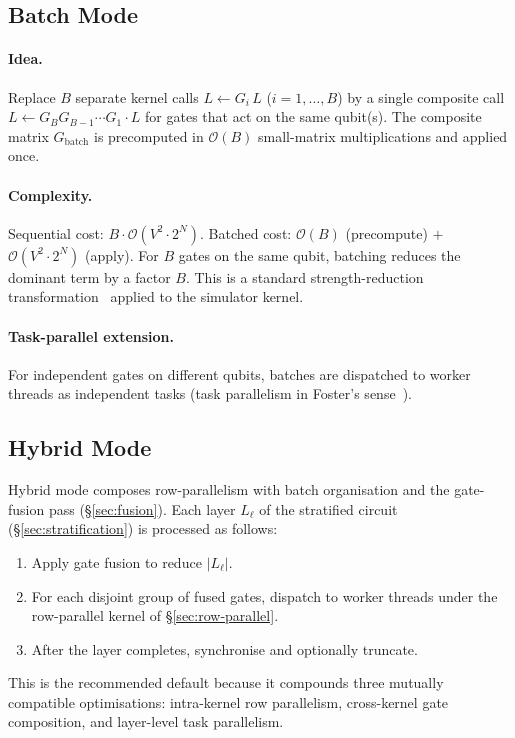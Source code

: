 \documentclass[11pt,a4paper]{article}
\begin{document}
\subsection{Batch Mode}
\label{sec:batch-mode}

\paragraph{Idea.}
Replace $B$ separate kernel calls $L \leftarrow G_i\,L$ ($i=1,\ldots,B$) by a single
composite call $L \leftarrow G_B G_{B-1} \cdots G_1 \cdot L$ for gates that act on the
same qubit(s). The composite matrix $G_\mathrm{batch}$ is precomputed in $\mathcal{O}(B)$
small-matrix multiplications and applied once.

\paragraph{Complexity.}
Sequential cost: $B \cdot \mathcal{O}(V^2 \cdot 2^N)$. Batched cost: $\mathcal{O}(B)$
(precompute) $+$ $\mathcal{O}(V^2\cdot 2^N)$ (apply). For $B$ gates on the same qubit,
batching reduces the dominant term by a factor $B$. This is a standard strength-reduction
transformation~\cite{cormen2009} applied to the simulator kernel.

\paragraph{Task-parallel extension.}
For independent gates on different qubits, batches are dispatched to worker threads as
independent tasks (task parallelism in Foster's sense~\cite{foster1995}).

\subsection{Hybrid Mode}
\label{sec:hybrid-mode}

Hybrid mode composes row-parallelism with batch organisation and the gate-fusion pass
(\S\ref{sec:fusion}). Each layer $L_\ell$ of the stratified circuit
(\S\ref{sec:stratification}) is processed as follows:
\begin{enumerate}
  \item Apply gate fusion to reduce $|L_\ell|$.
  \item For each disjoint group of fused gates, dispatch to worker threads under
        the row-parallel kernel of \S\ref{sec:row-parallel}.
  \item After the layer completes, synchronise and optionally truncate.
\end{enumerate}
This is the recommended default because it compounds three mutually compatible
optimisations: intra-kernel row parallelism, cross-kernel gate composition, and
layer-level task parallelism.
\end{document}

